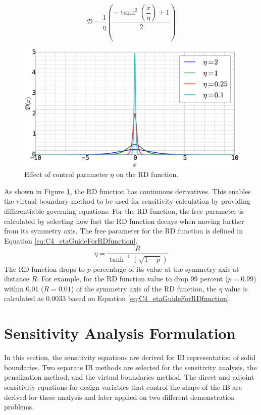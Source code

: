 %
\begin{equation}\label{eq:C4_deltaFunction}
    \mathcal{D} = \dfrac{1}{\eta} \left( \dfrac{-\tanh^{2}{\left (\dfrac{x}{\eta} \right )} + 1}{2} \right)
\end{equation}
%
%
\begin{figure}[H]
    \centering
    \includegraphics[width=12.00cm]{Chapter_4/figure/delta_function_with_control.eps}
    \caption{Effect of control parameter $\eta$ on the RD function.}
    \label{fig:C4_deltaFunctionWithControlParamter}
\end{figure}
%
As shown in Figure \ref{fig:C4_deltaFunctionWithControlParamter}, the RD function has continuous derivatives. This enables the virtual boundary method to be used for sensitivity calculation by providing differentiable governing equations. For the RD function, the free parameter is calculated by selecting how fast the RD function decays when moving further from its symmetry axis. The free parameter for the RD function is defined in Equation \eqref{eq:C4_etaGuideForRDfunction}.
%
\begin{equation}\label{eq:C4_etaGuideForRDfunction}
    \eta = \frac{R}{\tanh^{-1} (\sqrt{1 - p})}
\end{equation}
%
The RD function drops to $p$ percentage of its value at the symmetry axis at distance $R$. For example, for the RD function value to drop 99 percent ($p = 0.99$) within 0.01 ($R = 0.01$) of the symmetry axis of the RD function, the $\eta$ value is calculated as $0.0033$ based on Equation \eqref{eq:C4_etaGuideForRDfunction}.
\section{Sensitivity Analysis Formulation}
In this section, the sensitivity equations are derived for IB representation of solid boundaries. Two separate IB methods are selected for the sensitivity analysis, the penalization method, and the virtual boundaries method. The direct and adjoint sensitivity equations for design variables that control the shape of the IB are derived for these analysis and later applied on two different demonstration problems. 

